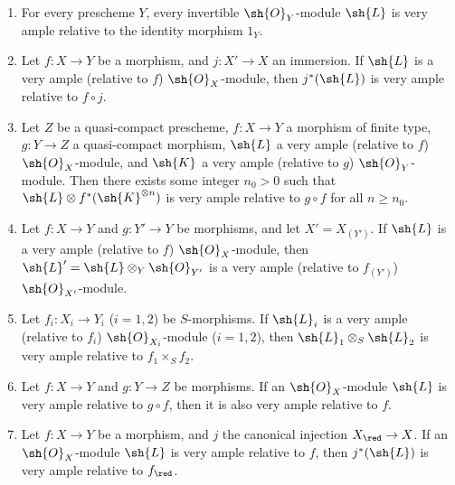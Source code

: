 \begin{proposition}[4.4.10]
\label{II.4.4.10}
\medskip\noindent
\begin{enumerate}
  \item[\rm{(i)}] For every prescheme $Y$, every invertible $\sh{O}_Y$-module $\sh{L}$ is very ample relative to the identity morphism $1_Y$.
  \item[\rm{(i \emph{bis})}] Let $f:X\to Y$ be a morphism, and $j:X'\to X$ an immersion.
    If $\sh{L}$ is a very ample (relative to $f$) $\sh{O}_X$-module, then $j^*(\sh{L})$ is very ample relative to $f\circ j$.
  \item[\rm{(ii)}] Let $Z$ be a quasi-compact prescheme, $f:X\to Y$ a morphism of finite type, $g:Y\to Z$ a quasi-compact morphism, $\sh{L}$ a very ample (relative to $f$) $\sh{O}_X$-module, and $\sh{K}$ a very ample (relative to $g$) $\sh{O}_Y$-module.
    Then there exists some integer $n_0>0$ such that $\sh{L}\otimes f^*(\sh{K}^{\otimes n})$ is very ample relative to $g\circ f$ for all $n\geq n_0$.
  \item[\rm{(iii)}] Let $f:X\to Y$ and $g:Y'\to Y$ be morphisms, and let $X'=X_{(Y')}$.
    If $\sh{L}$ is a very ample (relative to $f$) $\sh{O}_X$-module, then $\sh{L}'=\sh{L}\otimes_Y\sh{O}_{Y'}$ is a very ample (relative to $f_{(Y')}$) $\sh{O}_{X'}$-module.
  \item[\rm{(iv)}] Let $f_i:X_i\to Y_i$ ($i=1,2$) be $S$-morphisms.
    If $\sh{L}_i$ is a very ample (relative to $f_i$) $\sh{O}_{X_i}$-module ($i=1,2$), then $\sh{L}_1\otimes_S\sh{L}_2$ is very ample relative to $f_1\times_S f_2$.
  \item[\rm{(v)}] Let $f:X\to Y$ and $g:Y\to Z$ be morphisms.
    If an $\sh{O}_X$-module $\sh{L}$ is very ample relative to $g\circ f$, then it is also very ample relative to $f$.
  \item[\rm{(vi)}] Let $f:X\to Y$ be a morphism, and $j$ the canonical injection $X_\red\to X$.
    If an $\sh{O}_X$-module $\sh{L}$ is very ample relative to $f$, then $j^*(\sh{L})$ is very ample relative to $f_\red$.
\end{enumerate}
\end{proposition}

